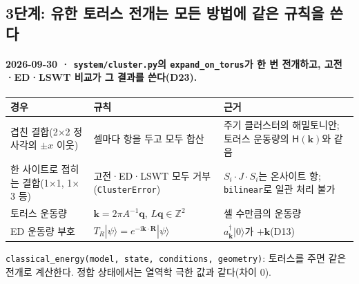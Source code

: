 \subsection{3단계: 유한 토러스 전개는 모든 방법에 같은 규칙을 쓴다}\label{stage3-torus-rules}
\begingroup%
  \framesubtitle{2026-09-30 · \texttt{system/cluster.py}의 \texttt{expand\_on\_torus}가 한 번 전개하고, 고전·ED·LSWT 비교가 그 결과를 쓴다(D23).}
  \small
  \begin{tabularx}{\textwidth}{@{}P{2.9cm}YP{2.6cm}@{}}
    \toprule
    경우 & 규칙 & 근거 \\
    \midrule
    겹친 결합(2$\times$2 정사각의 $\pm x$ 이웃) & 셀마다 항을 두고 모두 합산 & 주기 클러스터의 해밀토니안; 토러스 운동량의 $\mathsf H(\mathbf k)$와 같음 \\
    한 사이트로 접히는 결합(1$\times$1, 1$\times$3 등) & 고전·ED·LSWT 모두 거부(\texttt{ClusterError}) & $S_i\!\cdot\!J\!\cdot\!S_i$는 온사이트 항; \texttt{bilinear}로 일관 처리 불가 \\
    토러스 운동량 & $\mathbf k=2\pi A^{-1}\mathbf q$, $L\mathbf q\in\mathbb Z^2$ & 셀 수만큼의 운동량 \\
    ED 운동량 부호 & $T_R|\psi\rangle=e^{-\mathrm i\mathbf k\cdot\mathbf R}|\psi\rangle$ & $a_{\mathbf k}^\dagger|0\rangle$가 $+\mathbf k$(D13) \\
    \bottomrule
  \end{tabularx}
  \par\medskip
  \texttt{classical\_energy(model, state, conditions, geometry)}: 토러스를 주면 같은 전개로 계산한다. 정합 상태에서는 열역학 극한 값과 같다(차이 0).
  \par\medskip
\endgroup


